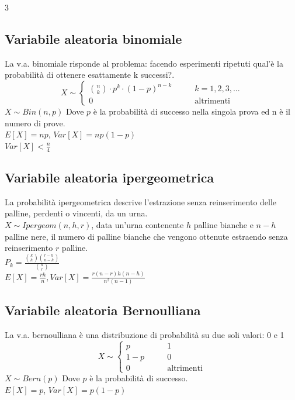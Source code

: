 \documentclass{article}
\begin{document}
\begin{multicols*}{3}
		\subsection{Variabile aleatoria binomiale}
		La v.a. binomiale risponde al problema: facendo esperimenti ripetuti qual'è la probabilità di ottenere esattamente k successi?.\\ 
		\begin{equation*}
			X \sim
			\left\{
			\begin{alignedat}{2}
				\binom{n}{k}\cdot p^k \cdot (1-p)^{n-k}  & \qquad k=1,2,3,...\\
				0            & \qquad \text{altrimenti}
			\end{alignedat}
			\right.
		\end{equation*}
		\(X \sim Bin(n,p)\) Dove \(p\) è la probabilità di successo nella singola prova ed n è il numero di prove.\\
		\(E[X] = np\), \(Var[X] = np(1-p)\)\\
		\(Var[X]< \frac{n}{4}\)
		
		\subsection{Variabile aleatoria ipergeometrica}
		La probabilità ipergeometrica descrive l'estrazione senza reinserimento delle palline, perdenti o vincenti, da un urna.\\
		\(X\sim Ipergeom(n,h,r)\), data un'urna contenente \(h\) palline bianche e \(n-h\) palline nere, il numero di palline bianche che vengono ottenute estraendo senza reinserimento \(r\) palline.\\
		\(P_k=\frac{\binom{k}{h}\binom{r-h}{n-k}}{\binom{n}{r}}\)\\ 
		\(E[X] = \frac{rh}{n}, Var[X] = \frac{r(n-r)h(n-h)}{n^2(n-1)}\)\\
		
		\subsection{Variabile aleatoria Bernoulliana}
		La v.a. bernoulliana è una distribuzione di probabilità su due soli valori: 0 e 1\\ 
		\begin{equation*}
			X \sim
			\left\{
			\begin{alignedat}{2}
				p  & \qquad 1\\
				1-p  & \qquad 0\\
				0            & \qquad \text{altrimenti}
			\end{alignedat}
			\right.
		\end{equation*}
		\(X \sim Bern(p)\) Dove \(p\) è la probabilità di successo.\\
		\(E[X] = p\), \(Var[X] = p(1-p)\)\\
		

\end{multicols*}
\end{document}
